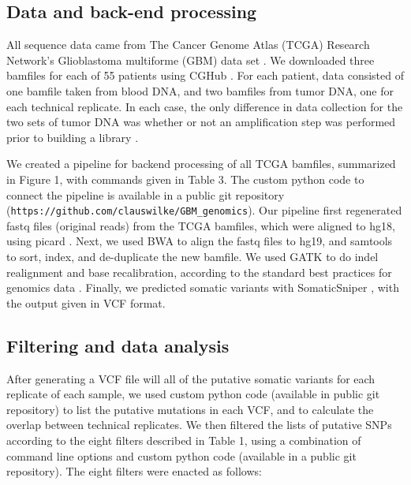 \documentclass[11pt]{article} %
\begin{document}
\subsection*{Data and back-end processing}

All sequence data came from The Cancer Genome Atlas (TCGA) Research Network's Glioblastoma multiforme (GBM) data set \citep{TCGA-GBM}. We downloaded three bamfiles for each of 55 patients using CGHub \citep{CGHub}. For each patient, data consisted of one bamfile taken from blood DNA, and two bamfiles from tumor DNA, one for each technical replicate. In each case, the only difference in data collection for the two sets of tumor DNA was whether or not an amplification step was performed prior to building a library \citep{TCGA-GBM}. 

We created a pipeline for backend processing of all TCGA bamfiles, summarized in Figure 1, with commands given in Table 3. The custom python code to connect the pipeline is available in a public 
git repository (\texttt{https://github.com/clauswilke/GBM\_genomics}). Our pipeline first regenerated fastq files (original reads) from the TCGA bamfiles, which were aligned to hg18, using picard \citep{picard}. Next, we used BWA \citep{bwa} to align the fastq files to hg19, and samtools \citep{SAMtools} to sort, index, and de-duplicate the new bamfile. We used GATK \citep{GATK} to do indel realignment and base recalibration, according to the standard best practices for genomics data \citep{best-practices}. Finally, we predicted somatic variants with SomaticSniper \citep{SomaticSniper}, with the output given in VCF format.

\subsection*{Filtering and data analysis}

After generating a VCF file will all of the putative somatic variants for each replicate of each sample, we used custom python code (available in public git repository) to list the putative mutations in each VCF, and to calculate the overlap between technical replicates. We then filtered the lists of putative SNPs according to the eight filters described in Table 1, using a combination of command line options and custom python code (available in a public git repository). The eight filters were enacted as follows: 
\end{document}
